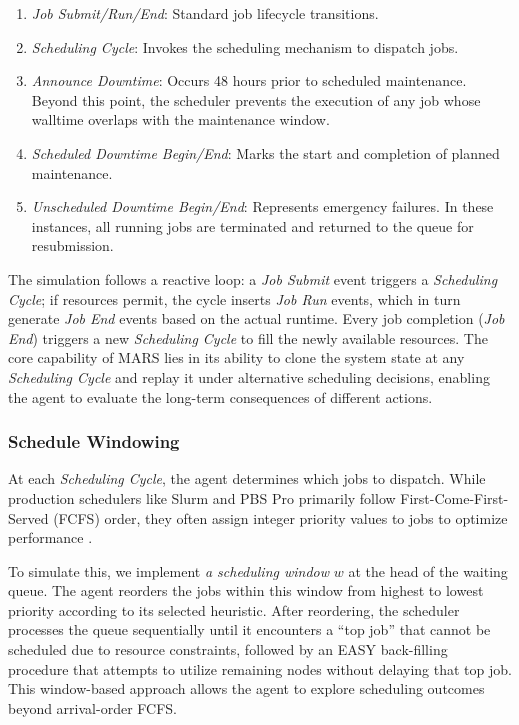 \documentclass[conference]{IEEEtran}
\begin{document}
\begin{enumerate}
    \item \textit{Job Submit/Run/End}: Standard job lifecycle transitions.
    \item \textit{Scheduling Cycle}: Invokes the scheduling mechanism to dispatch jobs.
    \item \textit{Announce Downtime}: Occurs 48 hours prior to scheduled maintenance. Beyond this point, the scheduler prevents the execution of any job whose walltime overlaps with the maintenance window.
    \item \textit{Scheduled Downtime Begin/End}: Marks the start and completion of planned maintenance.
    \item \textit{Unscheduled Downtime Begin/End}: Represents emergency failures. In these instances, all running jobs are terminated and returned to the queue for resubmission.
\end{enumerate}

The simulation follows a reactive loop: a \textit{Job Submit} event triggers a \textit{Scheduling Cycle}; if resources permit, the cycle inserts \textit{Job Run} events, which in turn generate \textit{Job End} events based on the actual runtime. Every job completion (\textit{Job End}) triggers a new \textit{Scheduling Cycle} to fill the newly available resources. The core capability of MARS lies in its ability to clone the system state at any \textit{Scheduling Cycle} and replay it under alternative scheduling decisions, enabling the agent to evaluate the long-term consequences of different actions.

\subsubsection{Schedule Windowing}
At each \textit{Scheduling Cycle}, the agent determines which jobs to dispatch. While production schedulers like Slurm \cite{SlurmDocs} and PBS Pro \cite{AltairPBSPro} primarily follow First-Come-First-Served (FCFS) order, they often assign integer priority values to jobs to optimize performance \cite{allcock_expatanl_2018}. 

To simulate this, we implement \emph{a scheduling window} $w$ at the head of the waiting queue. The agent reorders the jobs within this window from highest to lowest priority according to its selected heuristic. After reordering, the scheduler processes the queue sequentially until it encounters a ``top job'' that cannot be scheduled due to resource constraints, followed by an EASY back-filling procedure that attempts to utilize remaining nodes without delaying that top job. This window-based approach allows the agent to explore scheduling outcomes beyond arrival-order FCFS.
\end{document}
